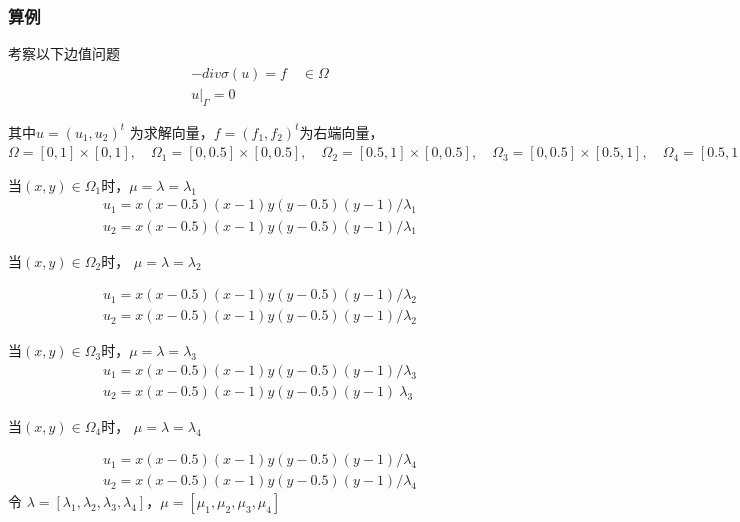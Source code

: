 \documentclass[a4paper,UTF8,titlepage]{ctexart}
\begin{document}
\subsubsection{算例}

考察以下边值问题
$$
\begin{matrix}
	-div \sigma(u) = f \quad \in \Omega  \\
	u |_{\Gamma} = 0
\end{matrix}
$$ 
\par
其中$ u = (u_1,u_2)^t $ 为求解向量，$ f = (f_1,f_2)^t $为右端向量，
$ 
\Omega = [0,1] \times [0,1] , \quad 
\Omega_1 = [0,0.5] \times [0,0.5] , \quad
\Omega_2 = [0.5,1] \times [0,0.5], \quad
\Omega_3 = [0,0.5] \times [0.5,1], \quad
\Omega_4 = [0.5,1] \times [0.5,1]
$ 
\par
当$(x,y) \in \Omega_1$时，$\mu = \lambda = \lambda_1$
$$
\begin{matrix}
	u_1 = x (x-0.5) (x-1) y (y-0.5) (y-1) / \lambda_1
	\\
	u_2 = x (x-0.5) (x-1) y (y-0.5) (y-1) / \lambda_1
\end{matrix}
$$

当$(x,y) \in \Omega_2$时， $\mu = \lambda = \lambda_2$

$$
\begin{matrix}
	u_1 = x (x-0.5) (x-1) y (y-0.5) (y-1) / \lambda_2 
	\\
	u_2 = x (x-0.5) (x-1) y (y-0.5) (y-1) / \lambda_2
\end{matrix}
$$

当$(x,y) \in \Omega_3$时，$\mu = \lambda = \lambda_3$
$$
\begin{matrix}
	u_1 = x (x-0.5) (x-1) y (y-0.5) (y-1) / \lambda_3
	\\
	u_2 = x (x-0.5) (x-1) y (y-0.5) (y-1) \ \lambda_3
\end{matrix}
$$

当$(x,y) \in \Omega_4$时， $\mu = \lambda = \lambda_4$

$$
\begin{matrix}
	u_1 = x (x-0.5) (x-1) y (y-0.5) (y-1) / \lambda_4 
	\\
	u_2 = x (x-0.5) (x-1) y (y-0.5) (y-1) / \lambda_4
\end{matrix}
$$
令 $\lambda = [\lambda_1, \lambda_2, \lambda_3, \lambda_4]$，$\mu = [\mu_1, \mu_2, \mu_3, \mu_4]$
\end{document}
